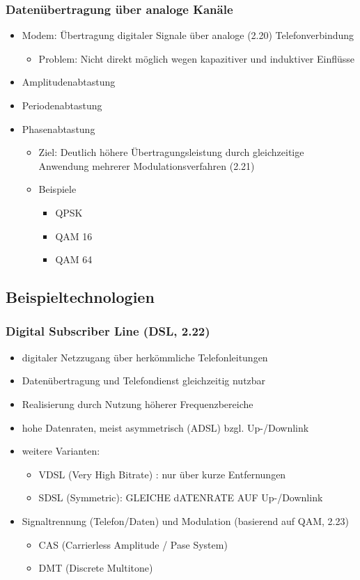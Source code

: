\subsubsection{Datenübertragung über analoge Kanäle}
\begin{itemize}
	\item Modem: Übertragung digitaler Signale über analoge (2.20) Telefonverbindung
	\begin{itemize}
		\item Problem: Nicht direkt möglich wegen kapazitiver und induktiver Einflüsse
	\end{itemize}
	\item Amplitudenabtastung
	\item Periodenabtastung
	\item Phasenabtastung
	\begin{itemize}
		\item Ziel: Deutlich höhere Übertragungsleistung durch gleichzeitige Anwendung mehrerer Modulationsverfahren (2.21)
		\item Beispiele
		\begin{itemize}
			\item QPSK
			\item QAM 16
			\item QAM 64
		\end{itemize}
	\end{itemize}
\end{itemize}

\subsection{Beispieltechnologien}
\subsubsection{Digital Subscriber Line (DSL, 2.22)}
\begin{itemize}
	\item digitaler Netzzugang über herkömmliche Telefonleitungen
	\item Datenübertragung und Telefondienst gleichzeitig nutzbar
	\item Realisierung durch Nutzung höherer Frequenzbereiche
	\item hohe Datenraten, meist asymmetrisch (ADSL) bzgl. Up-/Downlink
	\item weitere Varianten:
	\begin{itemize}
		\item VDSL (Very High Bitrate) : nur über kurze Entfernungen
		\item SDSL (Symmetric): GLEICHE dATENRATE AUF Up-/Downlink
	\end{itemize}
	\item Signaltrennung (Telefon/Daten) und Modulation (basierend auf QAM, 2.23)
	\begin{itemize}
		\item CAS (Carrierless Amplitude / Pase System)
		\item DMT (Discrete Multitone)
	\end{itemize}
\end{itemize}
